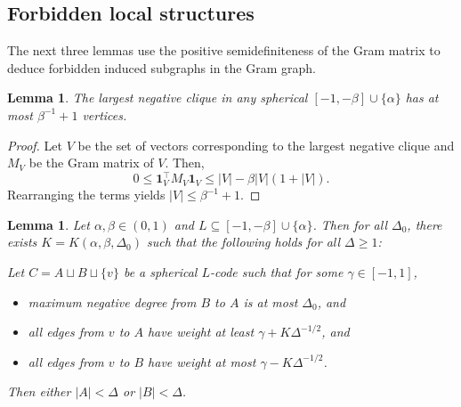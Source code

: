 \documentclass[reqno, 11pt]{amsart}
\newtheorem{lemma}[theorem]{Lemma}
\theoremstyle{definition}
\theoremstyle{remark}
\begin{document}
\subsection{Forbidden local structures}

The next three lemmas use the positive semidefiniteness of the Gram matrix to deduce forbidden induced subgraphs in the Gram graph.

\begin{lemma}\label{lem:negative-clique}
The largest negative clique in any spherical $[-1,-\beta]\cup\{\alpha\}$ has at most $\beta^{-1} + 1$ vertices.
\end{lemma}

\begin{proof}
Let $V$ be the set of vectors corresponding to the largest negative clique and $M_V$ be the Gram matrix of $V$. Then,
\[
	0 \leq \mathbf{1}_V^\intercal M_V\mathbf{1}_V \leq |V| - \beta |V| (1+|V|).
\]
Rearranging the terms yields $|V| \leq \beta^{-1} + 1$.
\end{proof}



\begin{lemma}\label{lem:very-strong-positive-clique}
Let $ \alpha, \beta \in(0,1)$ and $L \subseteq [-1,-\beta]\cup\{\alpha\}$. Then for all $\Delta_0$, there exists  $K=K(\alpha,\beta,\Delta_0)$ such that the following holds for all $\Delta \geq 1$: 

Let $C = A \sqcup B \sqcup \{v\}$ be a spherical $L$-code such that for some $\gamma \in [-1,1]$,
\begin{itemize}
    \item[(a)] maximum negative degree from $B$ to $A$ is at most $\Delta_0$, and
    \item[(b)] all edges from $v$ to $A$ have weight at least $\gamma + K\Delta^{-1/2}$, and
    \item[(c)] all edges from $v$ to $B$ have weight at most $\gamma - K\Delta^{-1/2}$.
\end{itemize}
Then either $|A| < \Delta$ or $|B| < \Delta$.
\end{lemma}
\end{document}
